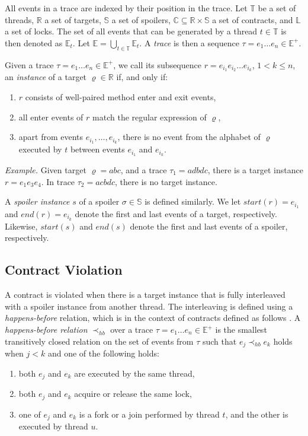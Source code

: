 All events in a trace are indexed by their position in the trace. Let
$\mathbb{T}$ be a set of threads, $\mathbb{R}$ a set of targets, $\mathbb{S}$ a
set of spoilers, $\mathbb{C} \subseteq \mathbb{R} \times \mathbb{S}$ a set of
contracts, and $\mathbb{L}$ a set of locks. The set of all events that can be
generated by a thread $t \in \mathbb{T}$ is then denoted as $\mathbb{E}_t$. Let
$\mathbb{E} = \bigcup_{t \in \mathbb{T}} \mathbb{E}_t$. A \emph{trace} is then a
sequence $\tau = e_1 \hdots e_n \in \mathbb{E}^+$.


Given a trace $\tau = e_1 \hdots e_n \in \mathbb{E}^+$, we call its subsequence
$r = e_{i_1} e_{i_2} \hdots e_{i_k}$, $1 < k \leq n$, an \emph{instance} of a
target $\varrho \in \mathbb{R}$ if, and only if:
\begin{enumerate}
    \item $r$ consists of well-paired method enter and exit events,
    \item all enter events of $r$ match the regular expression of $\varrho$,
    \item apart from events $e_{i_1},\ldots,e_{i_k}$, there is no event from the
        alphabet of $\varrho$ executed by $t$ between events $e_{i_1}$ and
        $e_{i_k}$.
\end{enumerate}

\emph{Example.} Given target $\varrho = abc$, and a trace $\tau_1 = adbdc$,
there is a target instance $r = e_1 e_3 e_4$. In trace $\tau_2 = acbdc$, there
is no target instance.

A \emph{spoiler instance} $s$ of a spoiler $\sigma \in \mathbb{S}$ is defined
similarly. We let $start(r) = e_{i_1}$ and $end(r) = e_{i_k}$ denote the first
and last events of a target, respectively. Likewise, $start(s)$ and $end(s)$
denote the first and last events of a spoiler, respectively.

\subsection{Contract Violation}

A contract is violated when there is a target instance that is fully interleaved
with a spoiler instance from another thread. The interleaving is defined using a
\emph{happens-before} relation, which is in the context of contracts defined as
follows \cite{contracts}. A \emph{happens-before relation} $\prec_{hb}$ over a
trace $\tau = e_1 \ldots e_n \in \mathbb{E}^+$ is the smallest transitively
closed relation on the set of events from $\tau$ such that $e_j \prec_{hb} e_k$
holds when $j < k$ and one of the following holds:
\begin{enumerate}
    \item both $e_j$ and $e_k$ are executed by the same thread,
    \item both $e_j$ and $e_k$ acquire or release the same lock,
    \item one of $e_j$ and $e_k$ is a fork or a join performed by thread $t$,
        and the other is executed by thread $u$.
\end{enumerate}

